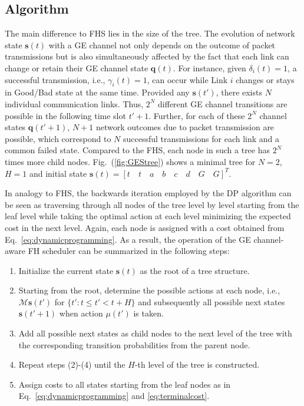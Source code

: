 \subsection{Algorithm}
The main difference to FHS lies in the size of the tree. The evolution of
network state $\boldsymbol{s}(t)$ with a GE channel not only depends on the
outcome of packet transmissions but is also simultaneously affected by the fact
that each link can change or retain their GE channel state $\boldsymbol{q}(t) $.
For instance, given $\delta_i(t)=1$, a successful transmission, i.e.,
$\gamma_i(t)=1$, can occur while Link $i$ changes or stays in Good/Bad state at
the same time. Provided any $\boldsymbol{s}(t')$, there exists $N$ individual
communication links. Thus, $2^N$ different GE channel transitions are possible
in the following time slot $t'+1$. Further, for each of these $2^N$ channel
states $\boldsymbol{q}(t'+1)$, $N+1$ network outcomes due to packet transmission
are possible, which correspond to $N$ successful transmissions for each link and
a common failed state. Compared to the FHS, each node in such a tree has $2^N$
times more child nodes. Fig.~(\ref{fig:GEStree}) shows a minimal tree for $N=2$,
$H=1$ and initial state $\boldsymbol{s}(t)=\left[t\quad t\quad a\quad b\quad
c\quad d\quad G\quad G \right]^T$.

In analogy to FHS, the backwards iteration employed by the DP algorithm can be
seen as traversing through all nodes of the tree level by level starting from
the leaf level while taking the optimal action at each level minimizing the
expected cost in the next level. Again, each node is assigned with a cost
obtained from Eq.~\eqref{eq:dynamicprogramming}. As a result, the operation of
the GE channel-aware FH scheduler can be summarized in the following steps:

\begin{enumerate}
	\item Initialize the current state $\boldsymbol{s}(t)$ as the root of a tree
	structure.
	\item Starting from the root, determine the possible actions at each node,
	i.e., $\mathcal{M}\boldsymbol{s}(t')$ for $\{t': t \leq t' < t + H \}$ and
	subsequently all possible next states $\boldsymbol{s}(t' + 1)$ when action
	$\mu(t')$ is taken.
	\item Add all possible next states as child nodes to the next level of the
	tree with the corresponding transition probabilities from the parent node.
	\item Repeat steps (2)-(4) until the $H$-th level of the tree is constructed.
	\item Assign costs to all states starting from the leaf nodes as in
	Eq.~\eqref{eq:dynamicprogramming} and \eqref{eq:terminalcost}.
\end{enumerate}

